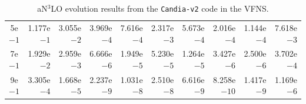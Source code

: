 \begin{table}[htp]
\begin{center}
\begin{tabular}{||c||r|r|r|r|r|r|r|r|r|}
 5e$-1$ &  1.177e$-1$ &  3.055e$-2$ &  3.969e$-4$ &  7.616e$-4$ &  2.317e$-3$ &  5.673e$-4$ &  2.016e$-4$ &  1.144e$-4$ &  7.618e$-3$ \\
 7e$-1$ &  1.929e$-2$ &  2.959e$-3$ &  6.666e$-6$ &  1.949e$-5$ &  5.230e$-5$ &  1.264e$-5$ &  3.427e$-6$ &  2.500e$-6$ &  3.702e$-4$ \\
 9e$-1$ &  3.305e$-4$ &  1.668e$-5$ &  2.237e$-9$ &  1.031e$-8$ &  2.510e$-8$ &  6.616e$-9$ &  8.258e$-10$ &  1.417e$-9$ &  1.169e$-6$ \\
\hline \hline
\end{tabular}
\end{center}
\caption{aN$^3$LO evolution results from the \texttt{Candia-v2} code in the VFNS.}
\label{tab:n3lo_evolution_results}
\end{table}
